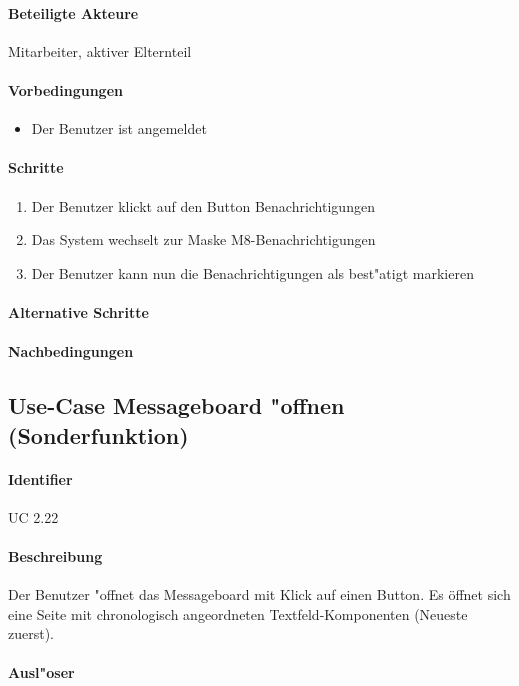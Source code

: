   \paragraph{Beteiligte Akteure}   \leavevmode \newline
    Mitarbeiter, aktiver Elternteil
  \paragraph{Vorbedingungen}
  \begin{itemize}
   \item Der Benutzer ist angemeldet
  \end{itemize}

  \paragraph{Schritte}
  \begin{enumerate}
   \item Der Benutzer klickt auf den Button \dq Benachrichtigungen\dq
   \item Das System wechselt zur Maske M8-Benachrichtigungen
   \item Der Benutzer kann nun die Benachrichtigungen als best"atigt markieren
  \end{enumerate}

  \paragraph{Alternative Schritte}
  \paragraph{Nachbedingungen}

  
  \newpage
 \subsection{Use-Case Messageboard "offnen (Sonderfunktion)}
  \paragraph{Identifier}
  UC 2.22
  \paragraph{Beschreibung}
  Der Benutzer "offnet das Messageboard mit Klick auf einen Button. Es öffnet sich eine Seite mit chronologisch angeordneten Textfeld-Komponenten (Neueste zuerst). 
  \paragraph{Ausl"oser}

